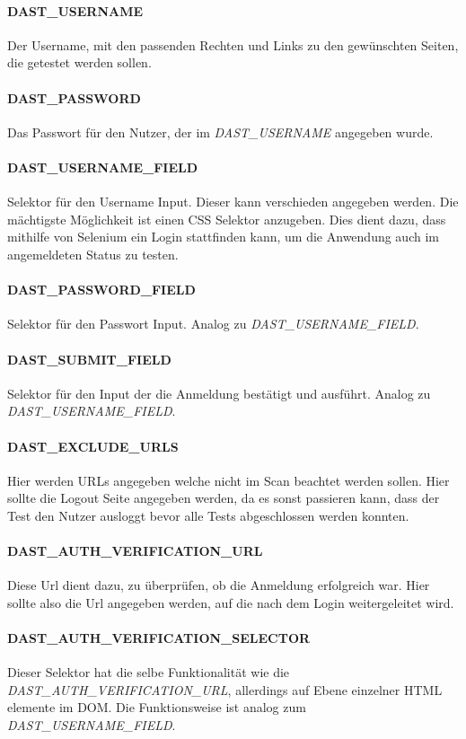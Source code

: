 \paragraph{DAST\_USERNAME}
Der Username, mit den passenden Rechten und Links zu den gewünschten Seiten, die getestet werden sollen.
\paragraph{DAST\_PASSWORD}
Das Passwort für den Nutzer, der im \textit{DAST\_USERNAME} angegeben wurde.
\paragraph{DAST\_USERNAME\_FIELD}
Selektor für den Username Input.
Dieser kann verschieden angegeben werden.
Die mächtigste Möglichkeit ist einen CSS Selektor anzugeben.
Dies dient dazu, dass mithilfe von Selenium ein Login stattfinden kann, um die Anwendung auch im angemeldeten Status zu testen.
\paragraph{DAST\_PASSWORD\_FIELD}
Selektor für den Passwort Input.
Analog zu \textit{DAST\_USERNAME\_FIELD}.
\paragraph{DAST\_SUBMIT\_FIELD}
Selektor für den Input der die Anmeldung bestätigt und ausführt.
Analog zu \textit{DAST\_USERNAME\_FIELD}.
\paragraph{DAST\_EXCLUDE\_URLS}
Hier werden URLs angegeben welche nicht im Scan beachtet werden sollen.
Hier sollte die Logout Seite angegeben werden, da es sonst passieren kann, dass der Test den Nutzer ausloggt bevor alle Tests abgeschlossen werden konnten.
\paragraph{DAST\_AUTH\_VERIFICATION\_URL}
Diese Url dient dazu, zu überprüfen, ob die Anmeldung erfolgreich war.
Hier sollte also die Url angegeben werden, auf die nach dem Login weitergeleitet wird.
\paragraph{DAST\_AUTH\_VERIFICATION\_SELECTOR}
Dieser Selektor hat die selbe Funktionalität wie die \textit{DAST\_AUTH\_VERIFICATION\_URL}, allerdings auf Ebene einzelner HTML elemente im DOM.
Die Funktionsweise ist analog zum \textit{DAST\_USERNAME\_FIELD}.
